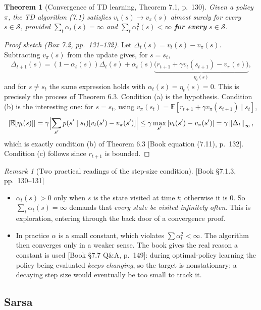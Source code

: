 \documentclass[11pt, letterpaper]{article}
\theoremstyle{runin}
\theoremstyle{runinplain}
\newtheorem{theorem}{Theorem}[section]
\theoremstyle{remark}
\newtheorem*{remark}{Remark}
\newcommand{\E}{\mathbb{E}}
\newcommand{\norm}[1]{\left\lVert #1 \right\rVert}
\newcommand{\abs}[1]{\left\lvert #1 \right\rvert}
\newcommand{\Sspace}{\mathcal{S}}
\newcommand{\bkin}[1]{{\color{bookblue}\small[\textsf{Book #1}]}}
\begin{document}
\begin{theorem}[Convergence of TD learning, Theorem 7.1, p.~130]
Given a policy $\pi$, the TD algorithm (7.1) satisfies $v_t(s)\to v_\pi(s)$ almost
surely for every $s\in\Sspace$, provided
$\sum_t\alpha_t(s)=\infty$ and $\sum_t\alpha_t^2(s)<\infty$ \textbf{for every}
$s\in\Sspace$.
\end{theorem}

\begin{proof}[Proof sketch (Box 7.2, pp.~131--132)]
Let $\Delta_t(s)=v_t(s)-v_\pi(s)$. Subtracting $v_\pi(s)$ from the update gives, for
$s=s_t$,
\[
  \Delta_{t+1}(s)=(1-\alpha_t(s))\Delta_t(s)
    +\alpha_t(s)\underbrace{\bigl(r_{t+1}+\gamma v_t(s_{t+1})-v_\pi(s)\bigr)}_{\eta_t(s)},
\]
and for $s\neq s_t$ the same expression holds with $\alpha_t(s)=\eta_t(s)=0$. This
is precisely the process of Theorem 6.3. Condition (a) is the hypothesis.
Condition (b) is the interesting one: for $s=s_t$, using
$v_\pi(s_t)=\E[r_{t+1}+\gamma v_\pi(s_{t+1})\mid s_t]$,
\[
  \abs{\E[\eta_t(s)]}=\gamma\Bigl|\sum_{s'}p(s'\mid s_t)[v_t(s')-v_\pi(s')]\Bigr|
  \le\gamma\max_{s'}\abs{v_t(s')-v_\pi(s')}=\gamma\norm{\Delta_t}_\infty,
\]
which is exactly condition (b) of Theorem 6.3 \bkin{equation (7.11), p.~132}.
Condition (c) follows since $r_{t+1}$ is bounded.
\end{proof}

\begin{remark}[Two practical readings of the step-size condition]
\bkin{\S7.1.3, pp.~130--131}
\begin{itemize}
  \item $\alpha_t(s)>0$ only when $s$ is the state visited at time $t$; otherwise it
        is $0$. So $\sum_t\alpha_t(s)=\infty$ demands that \emph{every state be
        visited infinitely often}. This is exploration, entering through the back
        door of a convergence proof.
  \item In practice $\alpha$ is a small constant, which violates
        $\sum\alpha_t^2<\infty$. The algorithm then converges only in a weaker
        sense. The book gives the real reason a constant is used
        \bkin{\S7.7 Q\&A, p.~149}: during optimal-policy learning the policy being
        evaluated \emph{keeps changing}, so the target is nonstationary; a decaying
        step size would eventually be too small to track it.
\end{itemize}
\end{remark}

\subsection{Sarsa}
\end{document}
